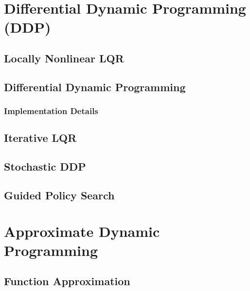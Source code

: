 
	\section{Differential Dynamic Programming (DDP)} %

		\subsection{Locally Nonlinear LQR} %

		\subsection{Differential Dynamic Programming} %

			\subsubsection{Implementation Details} %

		\subsection{Iterative LQR} %

		\subsection{Stochastic DDP} %

		\subsection{Guided Policy Search} %

	\section{Approximate Dynamic Programming} %

		\subsection{Function Approximation} %


